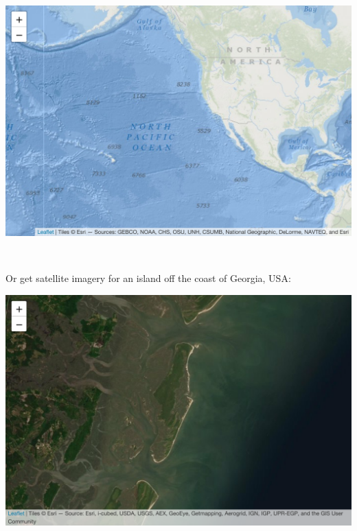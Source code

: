 \documentclass[
]{book}
\newenvironment{Shaded}{\begin{snugshade}}{\end{snugshade}}
\newcommand{\AttributeTok}[1]{\textcolor[rgb]{0.77,0.63,0.00}{#1}}
\newcommand{\FloatTok}[1]{\textcolor[rgb]{0.00,0.00,0.81}{#1}}
\newcommand{\FunctionTok}[1]{\textcolor[rgb]{0.00,0.00,0.00}{#1}}
\newcommand{\NormalTok}[1]{#1}
\newcommand{\SpecialCharTok}[1]{\textcolor[rgb]{0.00,0.00,0.00}{#1}}
\begin{document}
\includegraphics[width=694.08px]{figures/unnamed-chunk-228-1}

~

Or get satellite imagery for an island off the coast of Georgia, USA:

\begin{Shaded}
\end{Shaded}

\includegraphics[width=694.08px]{figures/unnamed-chunk-229-1}
\end{document}
